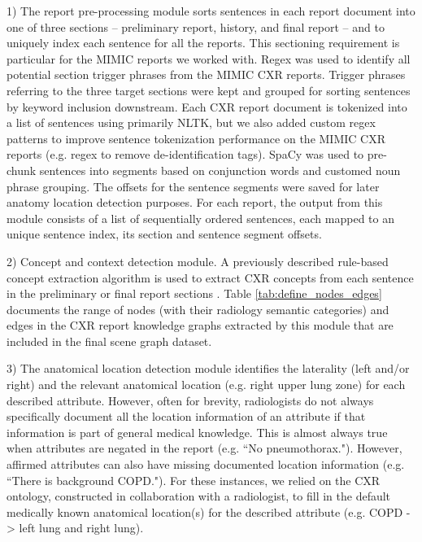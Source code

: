 1) The report pre-processing module sorts sentences in each report document into one of three sections -- preliminary report, history, and final report -- and to uniquely index each sentence for all the reports. This sectioning requirement is particular for the MIMIC reports we worked with. Regex was used to identify all potential section trigger phrases from the MIMIC CXR reports. Trigger phrases referring to the three target sections were kept and grouped for sorting sentences by keyword inclusion downstream. Each CXR report document is tokenized into a list of sentences using primarily NLTK, but we also added custom regex patterns to improve sentence tokenization performance on the MIMIC CXR reports (e.g. regex to remove de-identification tags). SpaCy was used to pre-chunk sentences into segments based on conjunction words and customed noun phrase grouping. The offsets for the sentence segments were saved for later anatomy location detection purposes. For each report, the output from this module consists of a list of sequentially ordered sentences, each mapped to an unique sentence index, its section and sentence segment offsets.

2) Concept and context detection module. A previously described rule-based concept extraction algorithm is used to extract CXR concepts from each sentence in the preliminary or final report sections \cite{}. %
Table \ref{tab:define_nodes_edges} documents the range of nodes (with their radiology semantic categories) and edges in the CXR report knowledge graphs extracted by this module that are included in the final scene graph dataset. %

3) The anatomical location detection module identifies the laterality (left and/or right) and the relevant anatomical location (e.g. right upper lung zone) for each described attribute. However, often for brevity, radiologists do not always specifically document all the location information of an attribute if that information is part of general medical knowledge. This is almost always true when attributes are negated in the report (e.g. ``No pneumothorax."). However, affirmed attributes can also have missing documented location information (e.g. ``There is background COPD."). For these instances, we relied on the CXR ontology, constructed in collaboration with a radiologist, to fill in the default medically known anatomical location(s) for the described attribute (e.g. COPD -> left lung and right lung). 

